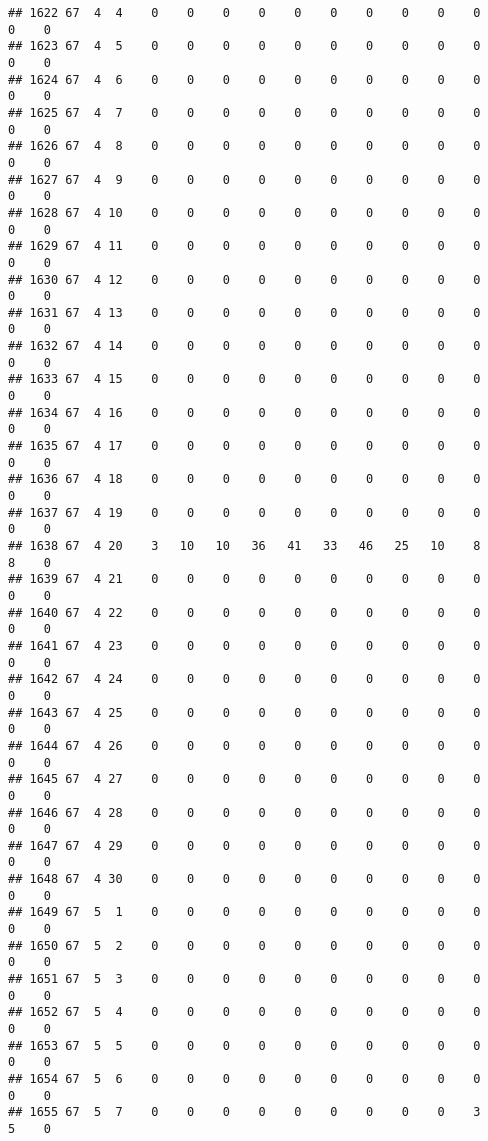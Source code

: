 \documentclass[]{article}
\begin{document}
\begin{verbatim}
## 1622 67  4  4    0    0    0    0    0    0    0    0    0    0    0    0
## 1623 67  4  5    0    0    0    0    0    0    0    0    0    0    0    0
## 1624 67  4  6    0    0    0    0    0    0    0    0    0    0    0    0
## 1625 67  4  7    0    0    0    0    0    0    0    0    0    0    0    0
## 1626 67  4  8    0    0    0    0    0    0    0    0    0    0    0    0
## 1627 67  4  9    0    0    0    0    0    0    0    0    0    0    0    0
## 1628 67  4 10    0    0    0    0    0    0    0    0    0    0    0    0
## 1629 67  4 11    0    0    0    0    0    0    0    0    0    0    0    0
## 1630 67  4 12    0    0    0    0    0    0    0    0    0    0    0    0
## 1631 67  4 13    0    0    0    0    0    0    0    0    0    0    0    0
## 1632 67  4 14    0    0    0    0    0    0    0    0    0    0    0    0
## 1633 67  4 15    0    0    0    0    0    0    0    0    0    0    0    0
## 1634 67  4 16    0    0    0    0    0    0    0    0    0    0    0    0
## 1635 67  4 17    0    0    0    0    0    0    0    0    0    0    0    0
## 1636 67  4 18    0    0    0    0    0    0    0    0    0    0    0    0
## 1637 67  4 19    0    0    0    0    0    0    0    0    0    0    0    0
## 1638 67  4 20    3   10   10   36   41   33   46   25   10    8    8    0
## 1639 67  4 21    0    0    0    0    0    0    0    0    0    0    0    0
## 1640 67  4 22    0    0    0    0    0    0    0    0    0    0    0    0
## 1641 67  4 23    0    0    0    0    0    0    0    0    0    0    0    0
## 1642 67  4 24    0    0    0    0    0    0    0    0    0    0    0    0
## 1643 67  4 25    0    0    0    0    0    0    0    0    0    0    0    0
## 1644 67  4 26    0    0    0    0    0    0    0    0    0    0    0    0
## 1645 67  4 27    0    0    0    0    0    0    0    0    0    0    0    0
## 1646 67  4 28    0    0    0    0    0    0    0    0    0    0    0    0
## 1647 67  4 29    0    0    0    0    0    0    0    0    0    0    0    0
## 1648 67  4 30    0    0    0    0    0    0    0    0    0    0    0    0
## 1649 67  5  1    0    0    0    0    0    0    0    0    0    0    0    0
## 1650 67  5  2    0    0    0    0    0    0    0    0    0    0    0    0
## 1651 67  5  3    0    0    0    0    0    0    0    0    0    0    0    0
## 1652 67  5  4    0    0    0    0    0    0    0    0    0    0    0    0
## 1653 67  5  5    0    0    0    0    0    0    0    0    0    0    0    0
## 1654 67  5  6    0    0    0    0    0    0    0    0    0    0    0    0
## 1655 67  5  7    0    0    0    0    0    0    0    0    0    3    5    0

\end{verbatim}
\end{document}
